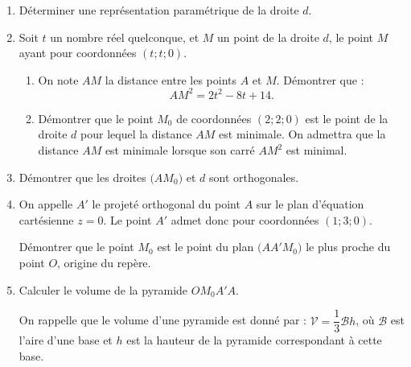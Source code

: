 \begin{enumerate}
	\item Déterminer une représentation paramétrique de la droite $d$.
	\item Soit $t$ un nombre réel quelconque, et $M$ un point de la droite $d$, le point $M$ ayant pour coordonnées $(t;t;0)$.
	\begin{enumerate}
		\item On note $AM$ la distance entre les points $A$ et $M$. Démontrer que : \[ AM^2 = 2t^2-8t+14. \]
		\item Démontrer que le point $M_0$ de coordonnées $(2;2;0)$ est le point de la droite $d$ pour lequel la distance $AM$ est minimale. On admettra que la distance $AM$ est minimale lorsque son carré $AM^2$ est minimal.
	\end{enumerate}
	\item Démontrer que les droites $\big(AM_0\big)$ et $d$ sont orthogonales.
	\item On appelle $A'$ le projeté orthogonal du point $A$ sur le plan d'équation cartésienne $z = 0$. Le point $A'$ admet donc pour coordonnées $(1;3;0)$.
	
	Démontrer que le point $M_0$ est le point du plan $\big(AA'M_0\big)$ le plus proche du point $O$, origine du repère.
	\item Calculer le volume de la pyramide $OM_0A'A$.
	
	On rappelle que le volume d'une pyramide est donné par : $\mathcal{V} = \dfrac13 \mathcal{B} h$, où $\mathcal{B}$ est l'aire d'une base et $h$ est la hauteur de la pyramide correspondant à cette base.
\end{enumerate}

